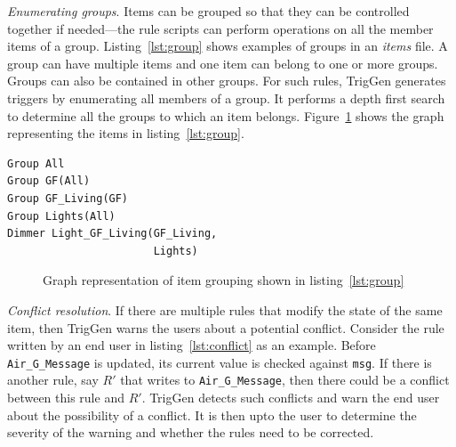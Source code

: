 \documentclass{sig-alternate-05-2015}
\begin{document}
\noindent \emph{Enumerating groups}. Items can be grouped so that they can be controlled together if needed---the rule scripts can perform operations on all the member items of a group. Listing~\ref{lst:group} shows examples of groups in an \textit{items} file.
A group can have multiple items and one item can belong to one or more groups. Groups can also be contained in other groups. For such rules, TrigGen generates triggers by enumerating all members of a group. It performs a depth first search to determine all the groups to which an item belongs. Figure~\ref{fig:graphstructure} shows the graph representing the items in listing~\ref{lst:group}. 
\begin{lstlisting}[caption={Grouping of items (GF stands for Ground Floor).},label={lst:group}]
Group All
Group GF(All)
Group GF_Living(GF) 										
Group Lights(All)
Dimmer Light_GF_Living(GF_Living,
                       Lights)
\end{lstlisting}
\begin{figure}
\centering
{}
\caption{Graph representation of item grouping shown in listing~\ref{lst:group}}
\label{fig:graphstructure} 
\end{figure}
\noindent \emph{Conflict resolution}. If there are multiple rules that modify the state of the same item, then TrigGen warns the users about a potential conflict. Consider the rule written by an end user in listing~\ref{lst:conflict} as an example. Before \texttt{Air\_G\_Message} is updated, its current value is checked against \texttt{msg}. If there is another rule, say $R'$ that writes to \texttt{Air\_G\_Message}, then there could be a conflict between this rule and $R'$. TrigGen detects such conflicts and warn the end user about the possibility of a conflict. It is then upto the user to determine the severity of the warning and whether the rules need to be corrected.
\end{document}

